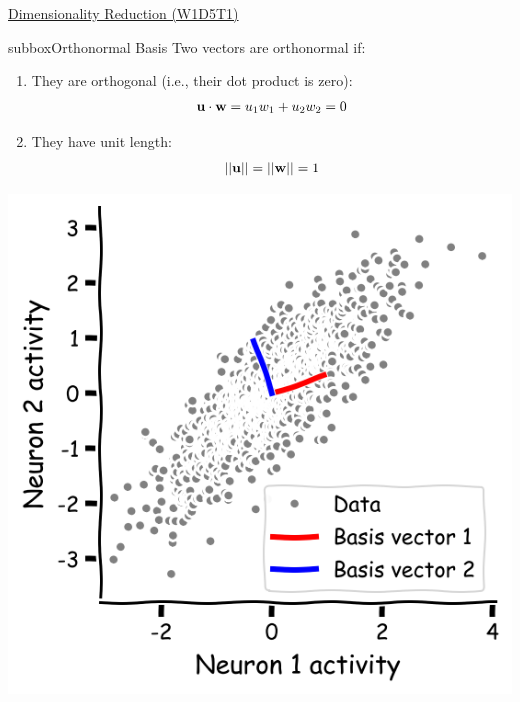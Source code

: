 \begin{textbox}{\href{https://compneuro.neuromatch.io/tutorials/W1D5_DimensionalityReduction/student/W1D5_Tutorial1.html}{Dimensionality Reduction (W1D5T1)} }
\begin{subbox}{subbox}{Orthonormal Basis
}
\scriptsize
Two vectors are orthonormal if: 
\begin{enumerate}
    \item 
   They are orthogonal (i.e., their dot product is zero):
\begin{align}
{\bf u\cdot w} = u_1 w_1 + u_2 w_2 = 0
\end{align}
\item   They have unit length:
\begin{align}
||{\bf u} || = ||{\bf w} || = 1
\end{align}
\end{enumerate}
\centering
\includegraphics[scale=0.2]{Figures/DM/DMFigure2.png}

\end{subbox}
\end{textbox}
